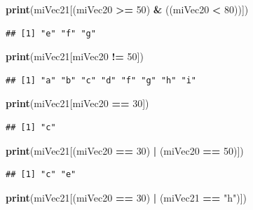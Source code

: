 \documentclass[]{book}
\newenvironment{Shaded}{\begin{snugshade}}{\end{snugshade}}
\newcommand{\KeywordTok}[1]{\textcolor[rgb]{0.13,0.29,0.53}{\textbf{#1}}}
\newcommand{\DecValTok}[1]{\textcolor[rgb]{0.00,0.00,0.81}{#1}}
\newcommand{\StringTok}[1]{\textcolor[rgb]{0.31,0.60,0.02}{#1}}
\newcommand{\OperatorTok}[1]{\textcolor[rgb]{0.81,0.36,0.00}{\textbf{#1}}}
\newcommand{\NormalTok}[1]{#1}
\begin{document}
\begin{Shaded}
\begin{Highlighting}[]
\KeywordTok{print}\NormalTok{(miVec21[(miVec20 }\OperatorTok{>=}\StringTok{ }\DecValTok{50}\NormalTok{) }\OperatorTok{&}\StringTok{ }\NormalTok{((miVec20 }\OperatorTok{<}\StringTok{ }\DecValTok{80}\NormalTok{))])}
\end{Highlighting}
\end{Shaded}

\begin{verbatim}
## [1] "e" "f" "g"
\end{verbatim}

\begin{Shaded}
\begin{Highlighting}[]
\KeywordTok{print}\NormalTok{(miVec21[miVec20 }\OperatorTok{!=}\StringTok{ }\DecValTok{50}\NormalTok{])}
\end{Highlighting}
\end{Shaded}

\begin{verbatim}
## [1] "a" "b" "c" "d" "f" "g" "h" "i"
\end{verbatim}

\begin{Shaded}
\begin{Highlighting}[]
\KeywordTok{print}\NormalTok{(miVec21[miVec20 }\OperatorTok{==}\StringTok{ }\DecValTok{30}\NormalTok{])}
\end{Highlighting}
\end{Shaded}

\begin{verbatim}
## [1] "c"
\end{verbatim}

\begin{Shaded}
\begin{Highlighting}[]
\KeywordTok{print}\NormalTok{(miVec21[(miVec20 }\OperatorTok{==}\StringTok{ }\DecValTok{30}\NormalTok{) }\OperatorTok{|}\StringTok{ }\NormalTok{(miVec20 }\OperatorTok{==}\StringTok{ }\DecValTok{50}\NormalTok{)])}
\end{Highlighting}
\end{Shaded}

\begin{verbatim}
## [1] "c" "e"
\end{verbatim}

\begin{Shaded}
\begin{Highlighting}[]
\KeywordTok{print}\NormalTok{(miVec21[(miVec20 }\OperatorTok{==}\StringTok{ }\DecValTok{30}\NormalTok{) }\OperatorTok{|}\StringTok{ }\NormalTok{(miVec21 }\OperatorTok{==}\StringTok{ "h"}\NormalTok{)])}
\end{Highlighting}
\end{Shaded}
\end{document}
